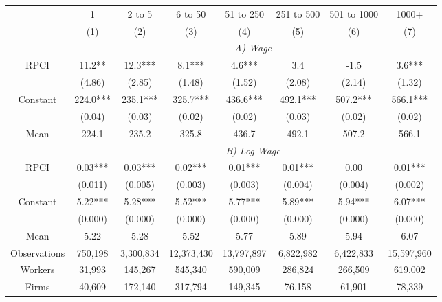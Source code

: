 \begin{tabular}{cccccccc}
\toprule
\toprule
      & 1     & 2 to 5 & 6 to 50 & 51 to 250 & 251 to 500 & 501 to 1000 & 1000+ \\
      & (1)   & (2)   & (3)   & (4)   & (5)   & (6)   & (7) \\
\cmidrule{2-8}      & \multicolumn{7}{c}{\textit{A) Wage}} \\
\midrule
RPCI  & 11.2** & 12.3*** & 8.1*** & 4.6*** & 3.4   & -1.5  & 3.6*** \\
      & (4.86) & (2.85) & (1.48) & (1.52) & (2.08) & (2.14) & (1.32) \\
Constant & 224.0*** & 235.1*** & 325.7*** & 436.6*** & 492.1*** & 507.2*** & 566.1*** \\
      & (0.04) & (0.03) & (0.02) & (0.02) & (0.03) & (0.02) & (0.02) \\
Mean  & 224.1 & 235.2 & 325.8 & 436.7 & 492.1 & 507.2 & 566.1 \\
\cmidrule{2-8}      & \multicolumn{7}{c}{\textit{B) Log Wage}} \\
\midrule
RPCI  & 0.03*** & 0.03*** & 0.02*** & 0.01*** & 0.01*** & 0.00  & 0.01*** \\
      & (0.011) & (0.005) & (0.003) & (0.003) & (0.004) & (0.004) & (0.002) \\
Constant & 5.22*** & 5.28*** & 5.52*** & 5.77*** & 5.89*** & 5.94*** & 6.07*** \\
      & (0.000) & (0.000) & (0.000) & (0.000) & (0.000) & (0.000) & (0.000) \\
Mean  & 5.22  & 5.28  & 5.52  & 5.77  & 5.89  & 5.94  & 6.07 \\
\midrule
Observations & 750,198 & 3,300,834 & 12,373,430 & 13,797,897 & 6,822,982 & 6,422,833 & 15,597,960 \\
Workers & 31,993 & 145,267 & 545,340 & 590,009 & 286,824 & 266,509 & 619,002 \\
Firms & 40,609 & 172,140 & 317,794 & 149,345 & 76,158 & 61,901 & 78,339 \\
\bottomrule
\bottomrule
\end{tabular}%
